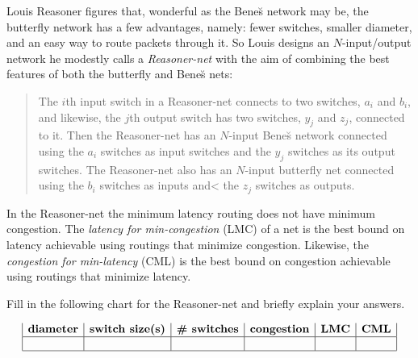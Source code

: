 \documentclass[12pt,twoside]{article}
\begin{document}
\begin{problem}{20}
Louis Reasoner figures that, wonderful as the Bene\u{s} network may be, the
butterfly network has a few advantages, namely: fewer switches, smaller
diameter, and an easy way to route packets through it.  So Louis designs an
$N$-input/output network he modestly calls a \textit{Reasoner-net} with the
aim of combining the best features of both the butterfly and Bene\u{s} nets:
\begin{quote}
The $i$th input switch in a Reasoner-net connects to two switches, $a_i$
and $b_i$, and likewise, the $j$th output switch has two switches, $y_j$
and $z_j$, connected to it.  Then the Reasoner-net has an $N$-input
Bene\u{s} network connected using the $a_i$ switches as input switches and
the $y_j$ switches as its output switches.  The Reasoner-net also has an
$N$-input butterfly net connected using the $b_i$ switches as inputs and<
the $z_j$ switches as outputs.
\end{quote}

In the Reasoner-net the minimum latency routing does not have minimum
congestion.  The \textit{latency for min-congestion} (LMC) of a net is the
best bound on latency achievable using routings that minimize congestion.
Likewise, the \textit{congestion for min-latency} (CML) is the best bound
on congestion achievable using routings that minimize latency.

Fill in the following chart for the Reasoner-net and briefly explain your
answers.

\[
\begin{array}{|c|c|c|c|c|c|}
\textbf{diameter} &
\textbf{switch size(s)} &
\textbf{\# switches} &
\textbf{congestion} &
\textbf{LMC} &
\textbf{CML}\\
\hline
&&&&&\\
\hline
\end{array}
\]

\end{problem}
\end{document}
